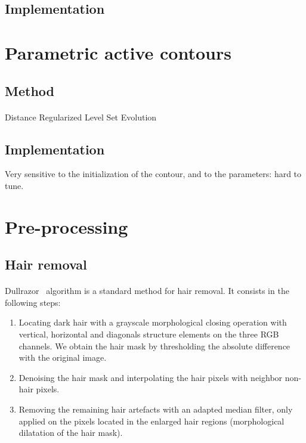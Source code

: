 \documentclass[a4paper,10pt]{article}
\begin{document}
\subsection{Implementation}

\section{Parametric active contours}
\subsection{Method}
\paragraph{}  Distance Regularized Level Set Evolution \cite{li2010distance} 
\subsection{Implementation}
Very sensitive to the initialization of the contour, and to the parameters: hard to tune.

\section{Pre-processing}
\subsection{Hair removal}
\paragraph{} Dullrazor~\cite{Dullrazor1997} algorithm is a standard method for 
hair removal. It consists in the following steps:
\begin{enumerate}
 \item Locating dark hair with a grayscale morphological closing operation with 
vertical, horizontal and diagonals structure elements on the three RGB channels. 
We obtain the hair mask by thresholding the absolute difference with the 
original image.
 \item Denoising the hair mask and interpolating the hair pixels with neighbor 
non-hair pixels. 
 \item Removing the remaining hair artefacts with an adapted median filter, only 
applied on the pixels located in the enlarged hair regions
 (morphological dilatation of the hair mask).
\end{enumerate}





\end{document}
